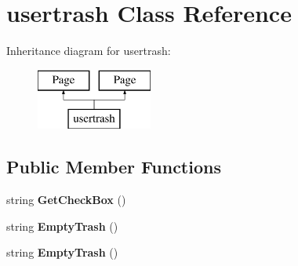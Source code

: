 \hypertarget{classusertrash}{\section{usertrash Class Reference}
\label{classusertrash}
}
Inheritance diagram for usertrash\-:\begin{figure}[H]
\begin{center}
\leavevmode
\includegraphics[height=2.000000cm]{classusertrash}
\end{center}
\end{figure}
\subsection*{Public Member Functions}
\begin{DoxyCompactItemize}
\item 
\hypertarget{classusertrash_a8799de39fc952f24542a3a159082d8af}{string {\bfseries Get\-Check\-Box} ()}\label{classusertrash_a8799de39fc952f24542a3a159082d8af}

\item 
\hypertarget{classusertrash_a9ea66dda0667d98c2299395e0c2811e6}{string {\bfseries Empty\-Trash} ()}\label{classusertrash_a9ea66dda0667d98c2299395e0c2811e6}

\item 
\hypertarget{classusertrash_a9ea66dda0667d98c2299395e0c2811e6}{string {\bfseries Empty\-Trash} ()}\label{classusertrash_a9ea66dda0667d98c2299395e0c2811e6}

\end{DoxyCompactItemize}
